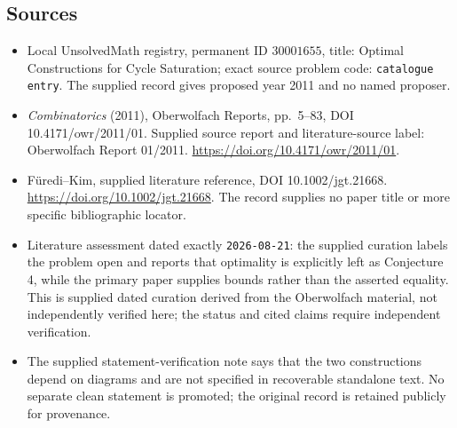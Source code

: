 \documentclass[11pt]{article}
\begin{document}
\subsection{Sources}
\begin{itemize}
\item Local UnsolvedMath registry, permanent ID \(30001655\), title: Optimal Constructions for Cycle Saturation; exact source problem code: \texttt{catalogue entry}. The supplied record gives proposed year 2011 and no named proposer.
\item \emph{Combinatorics} (2011), Oberwolfach Reports, pp.\ 5--83, DOI 10.4171/owr/2011/01. Supplied source report and literature-source label: Oberwolfach Report 01/2011. \url{https://doi.org/10.4171/owr/2011/01}.
\item F\"uredi--Kim, supplied literature reference, DOI 10.1002/jgt.21668. \url{https://doi.org/10.1002/jgt.21668}. The record supplies no paper title or more specific bibliographic locator.
\item Literature assessment dated exactly \texttt{2026-08-21}: the supplied curation labels the problem open and reports that optimality is explicitly left as Conjecture 4, while the primary paper supplies bounds rather than the asserted equality. This is supplied dated curation derived from the Oberwolfach material, not independently verified here; the status and cited claims require independent verification.
\item The supplied statement-verification note says that the two constructions depend on diagrams and are not specified in recoverable standalone text. No separate clean statement is promoted; the original record is retained publicly for provenance.
\end{itemize}
\end{document}
